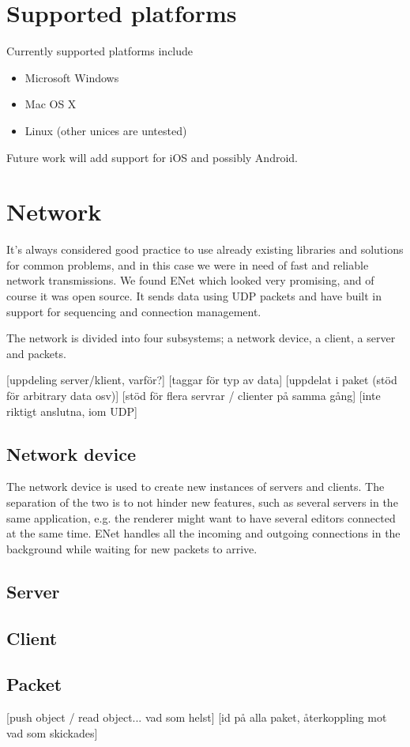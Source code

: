 \section{Supported platforms}
Currently supported platforms include
\begin{itemize}
\item Microsoft Windows
\item Mac OS X
\item Linux (other unices are untested)
\end{itemize}
Future work will add support for iOS and possibly Android.

\section{Network}
It's always considered good practice to use already existing libraries and solutions for common problems, and in this case we were in need of fast and reliable network transmissions.
We found ENet which looked very promising, and of course it was open source. It sends data using UDP packets and have built in support for sequencing and connection management.

The network is divided into four subsystems; a network device, a client, a server and packets.

[uppdeling server/klient, varför?]
[taggar för typ av data]
[uppdelat i paket (stöd för arbitrary data osv)]
[stöd för flera servrar / clienter på samma gång]
[inte riktigt anslutna, iom UDP]
\subsection{Network device}
The network device is used to create new instances of servers and clients. The separation of the two is to not hinder new features, such as several servers in the same application, e.g. the renderer might want to have several editors connected at the same time.
ENet handles all the incoming and outgoing connections in the background while waiting for new packets to arrive. 
\subsection{Server}
\subsection{Client}
\subsection{Packet}
[push object / read object... vad som helst]
[id på alla paket, återkoppling mot vad som skickades]

